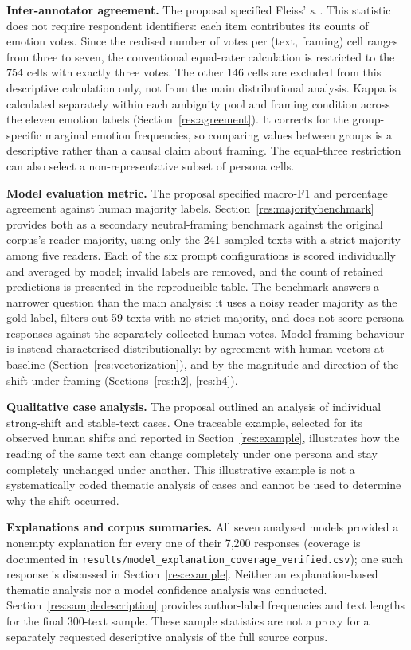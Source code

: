 \textbf{Inter-annotator agreement.} The proposal specified Fleiss' $\kappa$ \cite{Fleiss1971Kappa}.
This statistic does not require respondent identifiers: each item contributes its counts of
emotion votes. Since the realised number of votes per (text, framing) cell ranges from three to
seven, the conventional equal-rater calculation is restricted to the 754 cells with exactly three
votes. The other 146 cells are excluded from this descriptive calculation only, not from the main
distributional analysis. Kappa is calculated separately within each ambiguity pool and framing
condition across the eleven emotion labels (Section~\ref{res:agreement}). It corrects for the
group-specific marginal emotion frequencies, so comparing values between groups is a descriptive
rather than a causal claim about framing. The equal-three restriction can also select a
non-representative subset of persona cells.

\textbf{Model evaluation metric.} The proposal specified macro-F1 and percentage agreement
against human majority labels. Section~\ref{res:majoritybenchmark} provides both as a secondary
neutral-framing benchmark against the original corpus's reader majority, using only the 241
sampled texts with a strict majority among five readers. Each of the six prompt configurations is
scored individually and averaged by model; invalid labels are removed, and the count of retained
predictions is presented in the reproducible table. The benchmark answers a narrower question
than the main analysis: it uses a noisy reader majority as the gold label, filters out 59 texts
with no strict majority, and does not score persona responses against the separately
collected human votes. Model framing behaviour is instead characterised distributionally: by
agreement with human vectors at baseline (Section~\ref{res:vectorization}), and by the magnitude
and direction of the shift under framing (Sections~\ref{res:h2}, \ref{res:h4}).

\textbf{Qualitative case analysis.} The proposal outlined an analysis of individual strong-shift
and stable-text cases. One traceable example, selected for its observed human shifts and reported
in Section~\ref{res:example}, illustrates how the reading of the same text can change completely
under one persona and stay completely unchanged under another. This illustrative example is not a systematically
coded thematic analysis of cases and cannot be used to determine why the shift occurred.

\textbf{Explanations and corpus summaries.} All seven analysed models provided a nonempty
explanation for every one of their 7{,}200 responses (coverage is documented in
\texttt{results/\allowbreak model\_explanation\_coverage\_verified.csv}); one such response is
discussed in Section~\ref{res:example}. Neither an explanation-based thematic analysis nor a
model confidence analysis was conducted. Section~\ref{res:sampledescription} provides
author-label frequencies and text lengths for the final 300-text sample. These sample statistics
are not a proxy for a separately requested descriptive analysis of the full source corpus.

